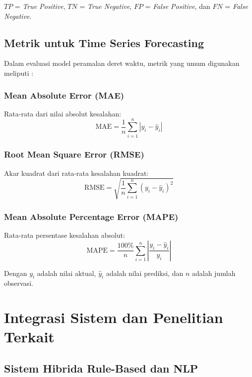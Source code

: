 $TP$ = \textit{True Positive}, $TN$ = \textit{True Negative}, $FP$ = \textit{False Positive}, dan $FN$ = \textit{False Negative}.

\subsection{Metrik untuk Time Series Forecasting}

Dalam evaluasi model peramalan deret waktu, metrik yang umum digunakan meliputi \parencite{sirisha2022profit,sunendar2025comparison}:

\subsubsection{Mean Absolute Error (MAE)}
Rata-rata dari nilai absolut kesalahan:
\begin{equation}
\text{MAE} = \frac{1}{n} \sum_{i=1}^n |y_i - \hat{y}_i|
\end{equation}

\subsubsection{Root Mean Square Error (RMSE)}
Akar kuadrat dari rata-rata kesalahan kuadrat:
\begin{equation}
\text{RMSE} = \sqrt{\frac{1}{n} \sum_{i=1}^n (y_i - \hat{y}_i)^2}
\end{equation}

\subsubsection{Mean Absolute Percentage Error (MAPE)}
Rata-rata persentase kesalahan absolut:
\begin{equation}
\text{MAPE} = \frac{100\%}{n} \sum_{i=1}^n \left|\frac{y_i - \hat{y}_i}{y_i}\right|
\end{equation}

Dengan $y_i$ adalah nilai aktual, $\hat{y}_i$ adalah nilai prediksi, dan $n$ adalah jumlah observasi.

\section{Integrasi Sistem dan Penelitian Terkait}

\subsection{Sistem Hibrida Rule-Based dan NLP}

